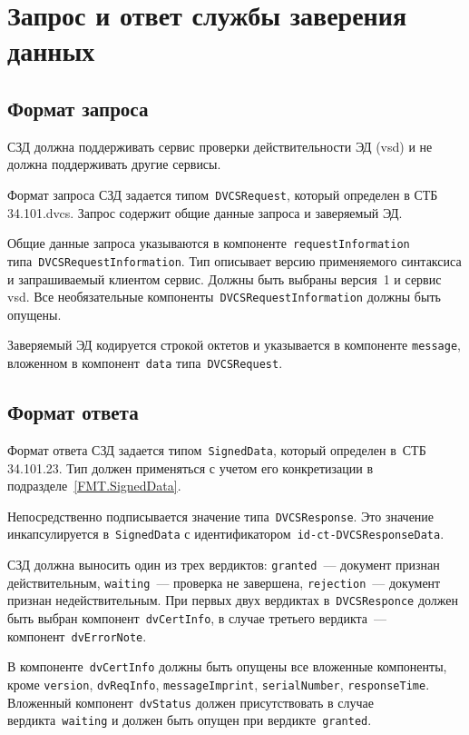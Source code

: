 \section{Запрос и ответ службы заверения данных}\label{FMT.DVCS}

\subsection{Формат запроса}

СЗД должна поддерживать сервис проверки действительности ЭД (vsd) и не 
должна поддерживать другие сервисы.

Формат запроса СЗД задается типом~\texttt{DVCSRequest}, который определен  
в СТБ 34.101.dvcs. Запрос содержит общие данные запроса и заверяемый ЭД.

Общие данные запроса указываются в компоненте~\texttt{requestInformation}
типа~\texttt{DVCSRequestInformation}. Тип описывает версию 
применяемого синтаксиса и запрашиваемый клиентом сервис. 
Должны быть выбраны версия~1 и сервис vsd. Все необязательные 
компоненты~\texttt{DVCSRequestInformation} должны быть опущены.

Заверяемый ЭД кодируется строкой октетов 
и указывается в компоненте \texttt{message}, вложенном в 
компонент~\texttt{data} типа~\texttt{DVCSRequest}.

\subsection{Формат ответа}

Формат ответа СЗД задается типом~\texttt{SignedData}, который определен 
в~СТБ 34.101.23. Тип должен применяться с учетом его конкретизации в 
подразделе~\ref{FMT.SignedData}.
 
Непосредственно подписывается значение типа~\texttt{DVCSResponse}.
Это значение инкапсулируется в~\texttt{SignedData} с 
идентификатором~\texttt{id-ct-DVCSResponseData}.

СЗД должна выносить один из трех вердиктов:
\texttt{granted}~--- документ признан действительным,
\texttt{waiting}~--- проверка не завершена,
\texttt{rejection}~--- документ признан недействительным.
%
При первых двух вердиктах в~\texttt{DVCSResponce}
должен быть выбран компонент~\texttt{dvCertInfo},
в случае третьего вердикта~--- компонент~\texttt{dvErrorNote}.

В компоненте~\texttt{dvCertInfo} должны быть опущены все вложенные 
компоненты, кроме \texttt{version}, \texttt{dvReqInfo}, \texttt{messageImprint}, 
\texttt{serialNumber}, \texttt{responseTime}.
Вложенный компонент~\texttt{dvStatus} должен присутствовать в случае 
вердикта~\texttt{waiting} и должен быть опущен при 
вердикте~\texttt{granted}. 

